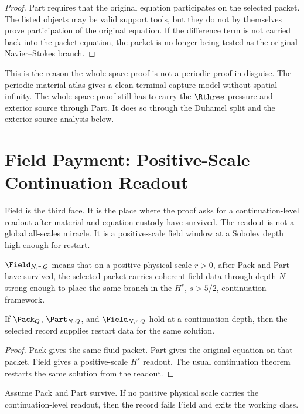 \begin{proof}
Part requires that the original equation participates on the selected packet.
The listed objects may be valid support tools, but they do not by themselves prove participation of the original equation.
If the difference term is not carried back into the packet equation, the packet is no longer being tested as the original Navier--Stokes branch.
\end{proof}

This is the reason the whole-space proof is not a periodic proof in disguise.
The periodic material atlas gives a clean terminal-capture model without spatial infinity.
The whole-space proof still has to carry the \(\Rthree\) pressure and exterior source through Part.
It does so through the Duhamel split and the exterior-source analysis below.

\section{Field Payment: Positive-Scale Continuation Readout}

Field is the third face.
It is the place where the proof asks for a continuation-level readout after material and equation custody have survived.
The readout is not a global all-scales miracle.
It is a positive-scale field window at a Sobolev depth high enough for restart.

\begin{definition}
\(\Field_{N,r,Q}\) means that on a positive physical scale \(r>0\), after Pack and Part have survived, the selected packet carries coherent field data through depth \(N\) strong enough to place the same branch in the \(H^s\), \(s>5/2\), continuation framework.
\end{definition}

\begin{lemma}
If \(\Pack_Q\), \(\Part_{N,Q}\), and \(\Field_{N,r,Q}\) hold at a continuation depth, then the selected record supplies restart data for the same solution.
\end{lemma}

\begin{proof}
Pack gives the same-fluid packet.
Part gives the original equation on that packet.
Field gives a positive-scale \(H^s\) readout.
The usual continuation theorem restarts the same solution from the readout.
\end{proof}

\begin{lemma}
Assume Pack and Part survive.
If no positive physical scale carries the continuation-level readout, then the record fails Field and exits the working class.
\end{lemma}

